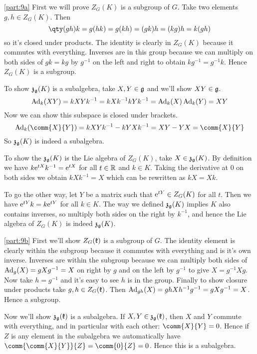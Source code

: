 \documentclass[
	pages,
	boxes,
	color=WildStrawberry
]{homework}
\begin{document}
\begin{solution}
	\ref{part:9a}
	First we will prove $Z_G(K)$ is a subgroup of $G$. Take two elements $g, h\in Z_G(K)$. Then
	\begin{equation*}
		\qty(gh)k = g(hk) = g(kh) = (gk)h = (kg)h = k(gh)
	\end{equation*}
	so it's closed under products. The identity is clearly in $Z_G(K)$ because it commutes with everything. Inverses are in this group because we can multiply on both sides of $gk = kg$ by $g^{-1}$ on the left and right to obtain $kg^{-1} = g^{-1}k$. Hence $Z_G(K)$ is a subgroup.

	To show $\mathfrak{z}_{\mathfrak{g}}(K)$ is a subalgebra, take $X, Y \in \mathfrak{g}$ and we'll show $XY\in\mathfrak{g}$.
	\begin{equation*}
		\operatorname{Ad}_k(XY) = kXYk^{-1} = kXk^{-1}kYk^{-1} = \operatorname{Ad}_k(X)\operatorname{Ad}_k(Y) = XY
	\end{equation*}
	Now we can show this subspace is closed under brackets.
	\begin{equation*}
		\Ad_k(\comm{X}{Y}) = kXYk^{-1} - kYXk^{-1} = XY - YX = \comm{X}{Y}
	\end{equation*}
	So $\mathfrak{z}_{\mathfrak{g}}(K)$ is indeed a subalgebra.

	To show the $\mathfrak{z}_{\mathfrak{g}}(K)$ is the Lie algebra of $Z_G(K)$, take $X\in\mathfrak{z}_{\mathfrak{g}}(K)$. By definition we have $k\mathrm{e}^{tX}k^{-1} = \mathrm{e}^{tX}$ for all $t\in\mathbb{R}$ and $k\in K$. Taking the derivative at 0 on both sides we obtain $kXk^{-1} = X$ which can be rewritten as $kX = Xk$.

	To go the other way, let $Y$ be a matrix such that $\mathrm{e}^{tY}\in Z_G(K)$ for all $t$. Then we have $\mathrm{e}^{tY}k = k\mathrm{e}^{tY}$ for all $k\in K$. The way we defined $\mathfrak{z}_{\mathfrak{g}}(K)$ implies $K$ also contains inverses, so multiply both sides on the right by $k^{-1}$, and hence the Lie algebra of $Z_G(K)$ is indeed $\mathfrak{z}_{\mathfrak{g}}(K)$.

	\ref{part:9b}
	First we'll show $Z_G(\mathfrak{k})$ is a subgroup of $G$. The identity element is clearly within the subgroup because it commutes with everything and is it's own inverse. Inverses are within the subgroup because we can multiply both sides of $\operatorname{Ad}_g(X) = gXg^{-1} = X$ on right by $g$ and on the left by $g^{-1}$ to give $X = g^{-1}Xg$. Now take $h = g^{-1}$ and it's easy to see $h$ is in the group. Finally to show closure under products take $g, h\in Z_G(\mathfrak{k})$. Then $\operatorname{Ad}_{gh}(X) = ghXh^{-1}g^{-1} = gXg^{-1} = X$. Hence a subgroup.

	Now we'll show $\mathfrak{z}_{\mathfrak{g}}(\mathfrak{k})$ is a subalgebra. If $X, Y\in\mathfrak{z}_{\mathfrak{g}}(\mathfrak{k})$, then $X$ and $Y$ commute with everything, and in particular with each other: $\comm{X}{Y} = 0$. Hence if $Z$ is any element in the subalgebra we automatically have $\comm{\comm{X}{Y}}{Z} = \comm{0}{Z} = 0$. Hence this is a subalgebra.


\end{solution}
\end{document}
